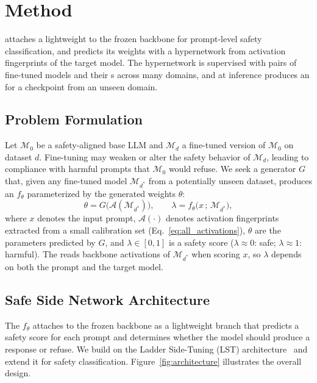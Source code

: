 \section{Method}
\label{sec:method}

\method{} attaches a lightweight \ssn{} to the frozen backbone for prompt-level safety classification, and predicts its weights with a hypernetwork from activation fingerprints of the target model. The hypernetwork is supervised with pairs of fine-tuned models and their \ssn{}s across many domains, and at inference produces an \ssn{} for a checkpoint from an unseen domain.


\subsection{Problem Formulation}

Let $\mathcal{M}_0$ be a safety-aligned base LLM and $\mathcal{M}_d$ a fine-tuned version of $\mathcal{M}_0$ on dataset $d$. Fine-tuning may weaken or alter the safety behavior of $\mathcal{M}_{d}$, leading to compliance with harmful prompts that $\mathcal{M}_0$ would refuse. We seek a generator $G$ that, given any fine-tuned model $\mathcal{M}_{d^*}$ from a potentially unseen dataset, produces an \ssn{} $f_\theta$ parameterized by the generated weights $\theta$:
\begin{equation}
    \theta = G\big(\mathcal{A}(\mathcal{M}_{d^*})\big), \qquad \lambda = f_\theta\big(x \,;\, \mathcal{M}_{d^*}\big),
\end{equation}
where $x$ denotes the input prompt, $\mathcal{A}(\cdot)$ denotes activation fingerprints extracted from a small calibration set (Eq.~\ref{eq:all_activations}), $\theta$ are the \ssn{} parameters predicted by $G$, and $\lambda \in [0,1]$ is a safety score ($\lambda \approx 0$: safe; $\lambda \approx 1$: harmful). The \ssn{} reads backbone activations of $\mathcal{M}_{d^*}$ when scoring $x$, so $\lambda$ depends on both the prompt and the target model.

\subsection{Safe Side Network Architecture}
\label{sec:arch}

The \ssn{} $f_\theta$ attaches to the frozen backbone as a lightweight branch that predicts a safety score for each prompt and determines whether the model should produce a response or refuse. We build on the Ladder Side-Tuning (LST) architecture~\citep{sung2022lst} and extend it for safety classification. Figure~\ref{fig:architecture} illustrates the overall design.

